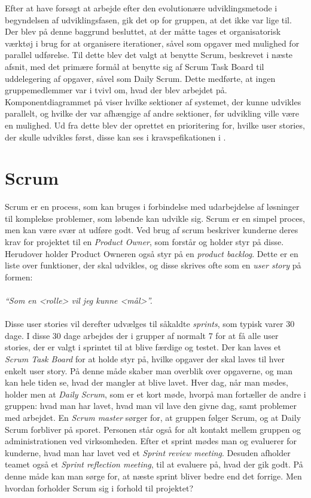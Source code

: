 Efter at have forsøgt at arbejde efter den evolutionære udviklingsmetode i begyndelsen af udviklingsfasen, gik det op for gruppen, at det ikke var lige til.
Der blev på denne baggrund besluttet, at der måtte tages et organisatorisk værktøj i brug for at organisere iterationer, såvel som opgaver med mulighed for parallel udførelse.
Til dette blev det valgt at benytte Scrum, beskrevet i næste afsnit, med det primære formål at benytte sig af Scrum Task Board til uddelegering af opgaver, såvel som Daily Scrum. 
Dette medførte, at ingen gruppemedlemmer var i tvivl om, hvad der blev arbejdet på.
Komponentdiagrammet på  viser hvilke sektioner af systemet, der kunne udvikles parallelt, og hvilke der var afhængige af andre sektioner, før udvikling ville være en mulighed.
Ud fra dette blev der oprettet en prioritering for, hvilke user stories, der skulle udvikles først, disse kan ses i kravspefikationen i .

\section{Scrum}\label{scrum}
Scrum er en process, som kan bruges i forbindelse med udarbejdelse af løsninger til komplekse problemer, som løbende kan udvikle sig. 
Scrum er en simpel proces, men kan være svær at udføre godt.
Ved brug af scrum beskriver kunderne deres krav for projektet til en \textit{Product Owner}, som  forstår og holder styr på disse.
Herudover holder Product Owneren også styr på en \textit{product backlog}.
Dette er en liste over funktioner, der skal udvikles, og disse skrives ofte som en \textit{user story} på formen:\\ \\ \textit{``Som en <rolle> vil jeg kunne <mål>''. }\\ \\
Disse user stories vil derefter udvælges til såkaldte \textit{sprints}, som typisk varer 30 dage. 
I disse 30 dage arbejdes der i grupper af normalt 7 for at få alle user stories, der er valgt i sprintet til at blive færdige og testet.
Der kan laves et \textit{Scrum Task Board} for at holde styr på, hvilke opgaver der skal laves til hver enkelt user story. 
På denne måde skaber man overblik over opgaverne, og man kan hele tiden se, hvad der mangler at blive lavet.
Hver dag, når man mødes, holder men at \textit{Daily Scrum}, som er et kort møde, hvorpå man fortæller de andre i gruppen: hvad man har lavet, hvad man vil lave den givne dag, samt problemer med arbejdet.
En \textit{Scrum master} sørger for, at gruppen følger Scrum, og at Daily Scrum forbliver på sporet. 
Personen står også for alt kontakt mellem gruppen og administrationen ved virksomheden.
Efter et sprint mødes man og evaluerer for kunderne, hvad man har lavet ved et \textit{Sprint review meeting}.
Desuden afholder teamet også et \textit{Sprint reflection meeting}, til at evaluere på, hvad der gik godt.
På denne måde kan man sørge for, at næste sprint bliver bedre end det forrige. \citep{A&I_DEV}
Men hvordan forholder Scrum sig i forhold til projektet?

